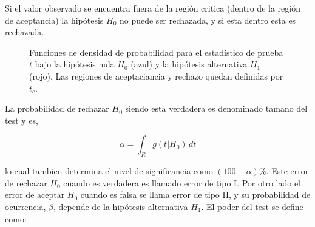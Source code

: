 Si el valor observado se encuentra fuera de la región critica (dentro de la
región de aceptancia) la hipótesis $H_0$ no puede ser rechazada, y si esta
dentro esta es rechazada.

\begin{figure}[h]
  \centering 
  \caption{Funciones de densidad de probabilidad para el estadístico de prueba
    $t$ bajo la hipótesis nula $H_0$ (azul) y la hipótesis alternativa $H_1$
    (rojo). Las regiones de aceptaciancia y rechazo quedan definidas por $t_c$.}
  \label{fig:stat_test}
\end{figure}





La probabilidad de rechazar $H_0$ siendo esta verdadera es denominado tamano del test y
es,

\begin{equation}
  \alpha = \int_{R} g(t|H_0)\, dt
\end{equation}

lo cual tambien determina el nivel de significancia como
$(100 - \alpha) \%$. Este error de rechazar $H_0$ cuando es verdadera es llamado
error de tipo I. Por otro lado el error de aceptar $H_0$ cuando es falsa se
llama error de tipo II, y su probabilidad de ocurrencia, $\beta$, depende de la
hipótesis alternativa $H_1$. El poder del test se define como: %

